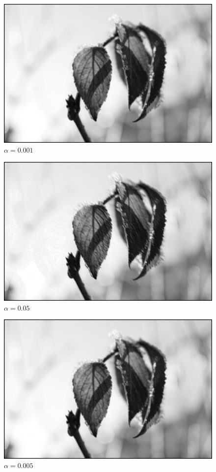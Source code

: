 \documentclass{article}
\theoremstyle{case}
\begin{document}
\begin{figure}
  \includegraphics[width=\linewidth]{../output/neu2_output_18k_alpha0001.png}
  \caption{$\alpha=0.001$}
  \label{fig:bilda4}
\end{figure}

\begin{figure}
  \includegraphics[width=\linewidth]{../output/neu2_output_18k_alpha005.png}
  \caption{$\alpha=0.05$}
  \label{fig:bilda5}
\end{figure}

\begin{figure}
  \includegraphics[width=\linewidth]{../output/neu2_output_18k_alpha0005.png}
  \caption{$\alpha=0.005$}
  \label{fig:bilda6}
\end{figure}
\end{document}
